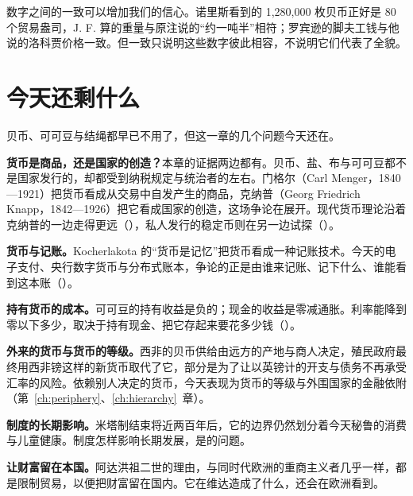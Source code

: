 数字之间的一致可以增加我们的信心。诺里斯看到的 1,280,000 枚贝币正好是 80 个贸易盎司，J. F. 算的重量与原注说的“约一吨半”相符；罗宾逊的脚夫工钱与他说的洛科贾价格一致。但一致只说明这些数字彼此相容，不说明它们代表了全貌。

\section{今天还剩什么}\label{sec:africa-legacy}

贝币、可可豆与结绳都早已不用了，但这一章的几个问题今天还在。

\textbf{货币是商品，还是国家的创造？}本章的证据两边都有。贝币、盐、布与可可豆都不是国家发行的，却都受到纳税规定与统治者的左右。门格尔（Carl Menger，1840—1921）把货币看成从交易中自发产生的商品，克纳普（Georg Friedrich Knapp，1842—1926）把它看成国家的创造，这场争论在展开。现代货币理论沿着克纳普的一边走得更远（），私人发行的稳定币则在另一边试探（）。

\textbf{货币与记账。}Kocherlakota 的“货币是记忆”把货币看成一种记账技术。今天的电子支付、央行数字货币与分布式账本，争论的正是由谁来记账、记下什么、谁能看到这本账（）。

\textbf{持有货币的成本。}可可豆的持有收益是负的；现金的收益是零减通胀。利率能降到零以下多少，取决于持有现金、把它存起来要花多少钱（）。

\textbf{外来的货币与货币的等级。}西非的贝币供给由远方的产地与商人决定，殖民政府最终用西非镑这样的新货币取代了它，部分是为了让以英镑计的开支与债务不再承受汇率的风险\cite{gardner2015}。依赖别人决定的货币，今天表现为货币的等级与外围国家的金融依附（第~\ref{ch:periphery}、\ref{ch:hierarchy}~章）。

\textbf{制度的长期影响。}米塔制结束将近两百年后，它的边界仍然划分着今天秘鲁的消费与儿童健康。制度怎样影响长期发展，是的问题。

\textbf{让财富留在本国。}阿达洪祖二世的理由，与同时代欧洲的重商主义者几乎一样，都是限制贸易，以便把财富留在国内。它在维达造成了什么，还会在欧洲看到。

